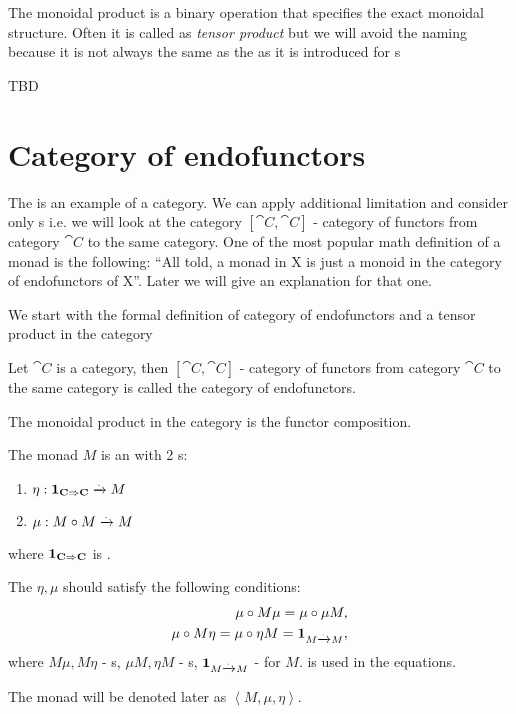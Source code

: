 \begin{remark}
\label{rem:monoidal_product}
The monoidal product is a binary operation that specifies the exact
monoidal structure. Often it is called as \textit{tensor product} but
we will avoid the naming because it is not always the same as the
 as it is introduced for
s  
\end{remark}

\begin{definition}
  \label{def:tensor_product}
  TBD
\end{definition}


\section{Category of endofunctors}

The  is an example of a category. We can
apply additional limitation and consider only
s i.e. we will look at the category
$[\cat{C}, \cat{C}]$ - category of functors from category $\cat{C}$ to
the same category. One of the most popular math definition of a monad
is the following: 
``All told, a monad in X is just a monoid in the category of
endofunctors of X''\cite{bib:maclane71}.
Later we will give an explanation for that one.

We start with the formal definition of category of endofunctors and a
tensor product in the category
\begin{definition}
\label{def:category_of_endofunctors}
Let $\cat{C}$ is a category, then $[\cat{C}, \cat{C}]$ - category of
functors from category $\cat{C}$ to the same category is called the
category of endofunctors.

The monoidal product in the category is the functor composition.
\end{definition}

\begin{definition}[Monad]
  \label{def:monad}
  The monad $M$ is an  with 2
  s:
  \begin{enumerate}
  \item $\eta: \mathbf{1}_{ \mathbf{C} \Rightarrow \mathbf{C} } \xrightarrow{.} M$
  \item $\mu: M \circ M \xrightarrow{.} M$
  \end{enumerate}
  where $\mathbf{1}_{ \mathbf{C} \Rightarrow \mathbf{C} }$ is .

  The $\eta, \mu$ should satisfy the following conditions:
  \begin{eqnarray}
    \mu \circ M \mu = \mu \circ \mu M, 
    \nonumber \\
    \mu \circ M \eta = \mu \circ \eta M = \mathbf{1}_{ M \xrightarrow{.} M },
    \label{eq:monad}
  \end{eqnarray}
  where $M \mu, M \eta$ - s, $\mu M, \eta M$ -
  s, $\mathbf{1}_{ M \xrightarrow{.} M }$ -  for $M$.
   is used in the equations.

  The monad will be denoted later as $\left<M, \mu, \eta\right>$.
\end{definition}

